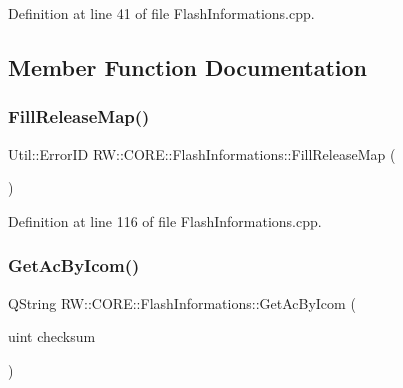 Definition at line 41 of file Flash\+Informations.\+cpp.



\subsection{Member Function Documentation}
\hypertarget{class_r_w_1_1_c_o_r_e_1_1_flash_informations_a80c0651369e180838543d0f125aa56ef}{}\label{class_r_w_1_1_c_o_r_e_1_1_flash_informations_a80c0651369e180838543d0f125aa56ef} 
\subsubsection{\texorpdfstring{Fill\+Release\+Map()}{FillReleaseMap()}}
{\footnotesize\ttfamily Util\+::\+Error\+ID R\+W\+::\+C\+O\+R\+E\+::\+Flash\+Informations\+::\+Fill\+Release\+Map (\begin{DoxyParamCaption}{ }\end{DoxyParamCaption})\hspace{0.3cm}{\ttfamily [private]}}



Definition at line 116 of file Flash\+Informations.\+cpp.

\hypertarget{class_r_w_1_1_c_o_r_e_1_1_flash_informations_a55b9f9803354a19f3f43e21590389a64}{}\label{class_r_w_1_1_c_o_r_e_1_1_flash_informations_a55b9f9803354a19f3f43e21590389a64} 
\subsubsection{\texorpdfstring{Get\+Ac\+By\+Icom()}{GetAcByIcom()}}
{\footnotesize\ttfamily Q\+String R\+W\+::\+C\+O\+R\+E\+::\+Flash\+Informations\+::\+Get\+Ac\+By\+Icom (\begin{DoxyParamCaption}\item[{uint}]{checksum }\end{DoxyParamCaption})\hspace{0.3cm}{\ttfamily [private]}}



